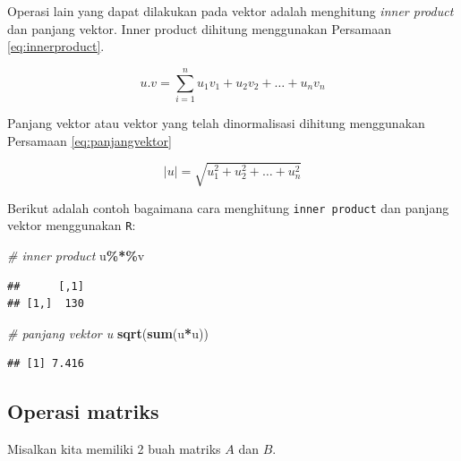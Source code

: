 \documentclass[
]{book}
\newenvironment{Shaded}{\begin{snugshade}}{\end{snugshade}}
\newcommand{\CommentTok}[1]{\textcolor[rgb]{0.56,0.35,0.01}{\textit{#1}}}
\newcommand{\FunctionTok}[1]{\textcolor[rgb]{0.13,0.29,0.53}{\textbf{#1}}}
\newcommand{\NormalTok}[1]{#1}
\newcommand{\SpecialCharTok}[1]{\textcolor[rgb]{0.81,0.36,0.00}{\textbf{#1}}}
\theoremstyle{definition}
\theoremstyle{definition}
\theoremstyle{definition}
\theoremstyle{definition}
\theoremstyle{remark}
\begin{document}
Operasi lain yang dapat dilakukan pada vektor adalah menghitung \emph{inner product} dan panjang vektor. Inner product dihitung menggunakan Persamaan \eqref{eq:innerproduct}.

\begin{equation}
u.v=\sum_{i=1}^nu_1v_1+u_2v_2+\dots+u_nv_n
  \label{eq:innerproduct}
\end{equation}

Panjang vektor atau vektor yang telah dinormalisasi dihitung menggunakan Persamaan \eqref{eq:panjangvektor}

\begin{equation}
\left|u\right|=\sqrt{u_1^2+u_2^2+\dots+u_n^2}
  \label{eq:panjangvektor}
\end{equation}

Berikut adalah contoh bagaimana cara menghitung \texttt{inner\ product} dan panjang vektor menggunakan \texttt{R}:

\begin{Shaded}
\begin{Highlighting}[]
\CommentTok{\# inner product}
\NormalTok{u}\SpecialCharTok{\%*\%}\NormalTok{v}
\end{Highlighting}
\end{Shaded}

\begin{verbatim}
##      [,1]
## [1,]  130
\end{verbatim}

\begin{Shaded}
\begin{Highlighting}[]
\CommentTok{\# panjang vektor u}
\FunctionTok{sqrt}\NormalTok{(}\FunctionTok{sum}\NormalTok{(u}\SpecialCharTok{*}\NormalTok{u))}
\end{Highlighting}
\end{Shaded}

\begin{verbatim}
## [1] 7.416
\end{verbatim}

\hypertarget{operasimatrik}{%
\subsection{Operasi matriks}\label{operasimatrik}}

Misalkan kita memiliki 2 buah matriks \(A\) dan \(B\).
\end{document}
